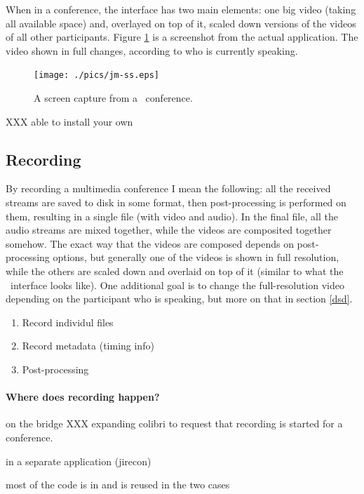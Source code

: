 \documentclass[twoside,openright,a4paper,11pt,english]{article}
\begin{document}
When in a conference, the interface has two main elements: one big video
(taking all available space) and, overlayed on top of it,
scaled down versions of the videos of all other participants. Figure
\ref{jm-ss} is a screenshot from the actual application. The video shown in
full changes, according to who is currently speaking.

\begin{figure}[h]
    \texttt{[image: ./pics/jm-ss.eps]}
    \label{jm-ss}
    \caption{A screen capture from a \jm\ conference.}
\end{figure}

XXX able to install your own \jm



\subsection{Recording}
\label{intro-recording}
By recording a multimedia conference I mean the following: all the received streams are saved to
disk in some format, then post-processing is performed on them, resulting in a
single file (with video and audio). In the final file, all the audio
streams are mixed together, while the videos are composited together somehow. The exact way that
the videos are composed depends on post-processing options, but generally one of the videos is shown in full resolution, while the others are scaled down and overlaid on top of it (similar to
what the \jm\ interface looks like). One additional goal is to change the
full-resolution video depending on the participant who is speaking, but more on that in section \ref{dsd}.

\begin{enumerate}
\item{Record individul files}
\item{Record metadata (timing info)}
\item{Post-processing}
\end{enumerate}


\paragraph*{Where does recording happen?}
on the bridge
XXX expanding colibri to request that recording is started for a conference.

in a separate application (jirecon)

most of the code is in \lj and is reused in the two cases
\end{document}
